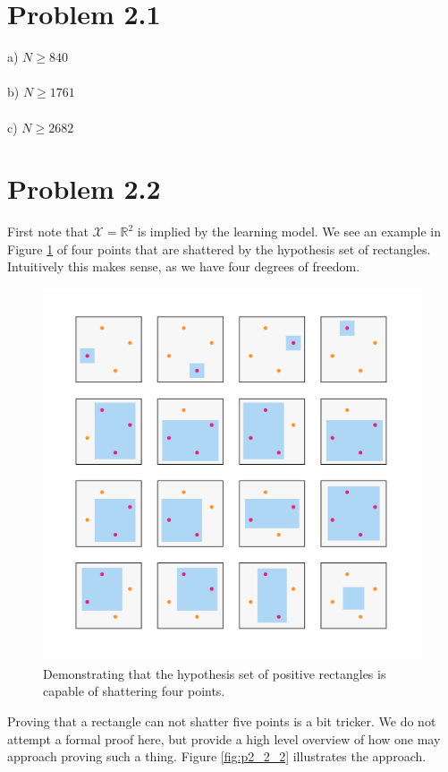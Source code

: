 \documentclass[11pt,letterpaper]{article}
\begin{document}
\section*{Problem 2.1}
a) $N \ge 840$
\\\\
b) $N \ge 1761$
\\\\
c) $N \ge 2682$

\section*{Problem 2.2}
First note that $\mathcal{X} = \mathbb{R}^2$ is implied by the learning model.  We see an example in Figure \ref{fig:p2_2_1} of four points that are shattered by the hypothesis set of rectangles.  Intuitively this makes sense, as we have four degrees of freedom.
\begin{figure}[]
    \centering
    \includegraphics[width=0.8\linewidth]{problem_2_2_a.pdf}
    \caption{Demonstrating that the hypothesis set of positive rectangles is capable of shattering four points.}
    \label{fig:p2_2_1}
\end{figure}
Proving that a rectangle can not shatter five points is a bit tricker.  We do not attempt a formal proof here, but provide a high level overview of how one may approach proving such a thing.  Figure \ref{fig:p2_2_2} illustrates the approach.
\end{document}
